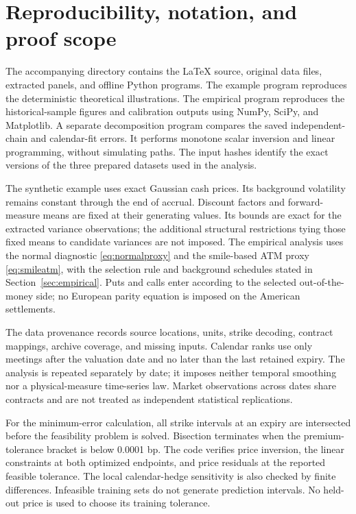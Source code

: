 \section{Reproducibility, notation, and proof scope}\label{app:implementation}
The accompanying directory contains the LaTeX source, original data files, extracted panels, and offline Python programs. The example program reproduces the deterministic theoretical illustrations. The empirical program reproduces the historical-sample figures and calibration outputs using NumPy, SciPy, and Matplotlib. A separate decomposition program compares the saved independent-chain and calendar-fit errors. It performs monotone scalar inversion and linear programming, without simulating paths. The input hashes identify the exact versions of the three prepared datasets used in the analysis.

The synthetic example uses exact Gaussian cash prices. Its background volatility remains constant through the end of accrual. Discount factors and forward-measure means are fixed at their generating values. Its bounds are exact for the extracted variance observations; the additional structural restrictions tying those fixed means to candidate variances are not imposed. The empirical analysis uses the normal diagnostic \eqref{eq:normalproxy} and the smile-based ATM proxy \eqref{eq:smileatm}, with the selection rule and background schedules stated in Section~\ref{sec:empirical}. Puts and calls enter according to the selected out-of-the-money side; no European parity equation is imposed on the American settlements.

The data provenance records source locations, units, strike decoding, contract mappings, archive coverage, and missing inputs. Calendar ranks use only meetings after the valuation date and no later than the last retained expiry. The analysis is repeated separately by date; it imposes neither temporal smoothing nor a physical-measure time-series law. Market observations across dates share contracts and are not treated as independent statistical replications.

For the minimum-error calculation, all strike intervals at an expiry are intersected before the feasibility problem is solved. Bisection terminates when the premium-tolerance bracket is below 0.0001 bp. The code verifies price inversion, the linear constraints at both optimized endpoints, and price residuals at the reported feasible tolerance. The local calendar-hedge sensitivity is also checked by finite differences. Infeasible training sets do not generate prediction intervals. No held-out price is used to choose its training tolerance.

